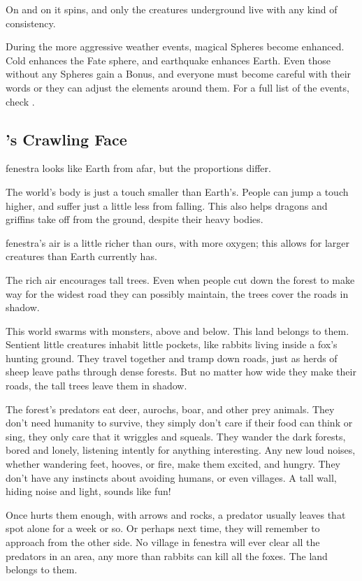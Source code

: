 \begin{multicols}{2}
On and on it spins, and only the creatures underground live with any kind of consistency.

During the more aggressive weather events, magical Spheres become enhanced.
Cold enhances the Fate sphere, and earthquake enhances Earth.
Even those without any Spheres gain a Bonus, and everyone must become careful with their words or they can adjust the elements around them.
For a full list of the events, check .

\subsection{'s Crawling Face}

\Gls{fenestra} looks like Earth from afar, but the proportions differ.

The world's body is just a touch smaller than Earth's.
People can jump a touch higher, and suffer just a little less from falling.
This also helps dragons and griffins take off from the ground, despite their heavy bodies.

\Gls{fenestra}'s air is a little richer than ours, with more oxygen; this allows for larger creatures than Earth currently has.

The rich air encourages tall trees.
Even when people cut down the forest to make way for the widest road they can possibly maintain, the trees cover the roads in shadow.

This world swarms with monsters, above and below.
This land belongs to them.
Sentient little creatures inhabit little pockets, like rabbits living inside a fox's hunting ground.
They travel together and tramp down roads, just as herds of sheep leave paths through dense forests.
But no matter how wide they make their roads, the tall trees leave them in shadow.

The forest's predators eat deer, aurochs, boar, and other prey animals.
They don't need humanity to survive, they simply don't care if their food can think or sing, they only care that it wriggles and squeals.
They wander the dark forests, bored and lonely, listening intently for anything interesting.
Any new loud noises, whether wandering feet, hooves, or fire, make them excited, and hungry.
They don't have any instincts about avoiding humans, or even \glspl{village}.
A tall wall, hiding noise and light, sounds like fun!

Once  hurts them enough, with arrows and rocks, a predator usually leaves that spot alone for a week or so.
Or perhaps next time, they will remember to approach from the other side.
No \gls{village} in \gls{fenestra} will ever clear all the predators in an area, any more than rabbits can kill all the foxes.
The land belongs to them.


\end{multicols}
